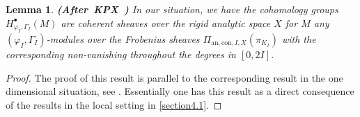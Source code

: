 \documentclass[12pt]{amsart}
\newtheorem{lemma}[theorem]{Lemma}
\theoremstyle{definition}
\numberwithin{equation}{section}
\begin{document}
%
%
%


\begin{lemma}\mbox{\bf{(After KPX \cite[6.3.3]{KPX})}}
In our situation, we have the cohomology groups $H^\bullet_{\varphi_I,\Gamma_I}(M)$ are coherent sheaves over the rigid analytic space $X$ for $M$ any $(\varphi_I,\Gamma_I)$-modules over the Frobenius sheaves $\Pi_{\mathrm{an},\mathrm{con},I,X}(\pi_{K_I})$ with the corresponding non-vanishing throughout the degrees in $[0,2I]$.	
\end{lemma}


\begin{proof}
The proof of this result is parallel to the corresponding result in the one dimensional situation, see \cite[6.3.3]{KPX}. Essentially one has this result as a direct consequence of the results in the local setting in \cref{section4.1}.
\end{proof}
\end{document}
